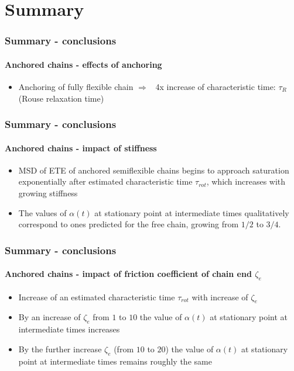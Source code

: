 \documentclass[handout]{beamer}
\begin{document}
\section{Summary}


\begin{frame}
    \frametitle{Summary - conclusions}
    \framesubtitle{Anchored chains - effects of anchoring}
    \begin{itemize}
        \item Anchoring of fully flexible chain $\Rightarrow$ ~4x increase of characteristic
        time: $\tau_R$ (Rouse relaxation time)
    \end{itemize}
\end{frame}

\begin{frame}
    \frametitle{Summary - conclusions}
    \framesubtitle{Anchored chains - impact of stiffness}
    \begin{itemize}
        \item MSD of ETE of anchored semiflexible chains begins to approach
        saturation exponentially after estimated characteristic 
        time $\tau_{rot}$, which increases with growing stiffness
        \item The values of $\alpha(t)$ at stationary point at intermediate times
        qualitatively correspond to ones predicted for the free chain,
        growing from $1/2$ to $3/4$.
    \end{itemize}
\end{frame}

\begin{frame}
    \frametitle{Summary - conclusions}
    \framesubtitle{Anchored chains - impact of friction coefficient of chain end $\zeta_e$}
    \begin{itemize}
        \item Increase of an estimated characteristic time $\tau_{rot}$ 
        with increase of $\zeta_e$
        \item By an increase of $\zeta_e$ from $1$ to $10$ the value of 
        $\alpha(t)$ at stationary point at intermediate times increases
        \item By the further increase $\zeta_e$ (from $10$ to $20$) 
        the value of $\alpha(t)$ at stationary point at intermediate times
        remains roughly the same
    \end{itemize}
\end{frame}
\end{document}
